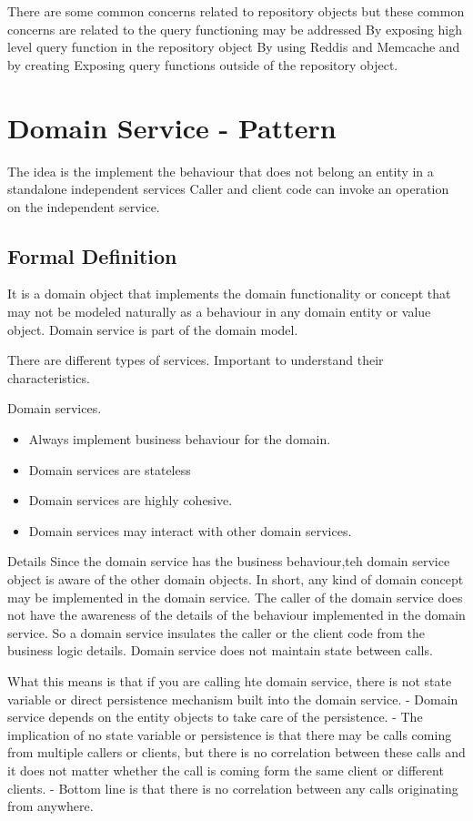 There are some common concerns related to repository objects but these common concerns are related to the query functioning may be addressed
By exposing high level query function in the repository object
By using Reddis and Memcache and by creating
Exposing query functions outside of the repository object.


\section{Domain Service - Pattern}
The idea is the implement the behaviour that does not belong an entity in a standalone independent services
Caller and client code can invoke an operation on the independent service.

\subsection{Formal Definition}
It is a domain object that implements the domain functionality or concept that may not be modeled naturally as a behaviour in any domain entity or value object.
Domain service is part of the domain model.

There are different types of services.
Important to understand their characteristics.

Domain services.
\begin{itemize}
    \item Always implement business behaviour for the domain.
    \item Domain services are stateless
    \item Domain services are highly cohesive.
    \item Domain services may interact with other domain services.
\end{itemize}

Details
Since the domain service has the business behaviour,teh domain service object is aware of the other domain objects.
In short, any kind of domain concept may be implemented in the domain service.
The caller of the domain service does not have the awareness of the details of the behaviour implemented in the domain service.
So a domain service insulates the caller or the client code from the business logic details.
Domain service does not maintain state between calls.

What this means is that if you are calling hte domain service, there is not state variable or direct persistence mechanism built into the domain service.
- Domain service depends on the entity objects to take care of the persistence.
- The implication of no state variable or persistence is that there may be calls coming from multiple callers or clients,
but there is no correlation between these calls and it does not matter whether the call is coming form the same client or different clients.
- Bottom line is that there is no correlation between any calls originating from anywhere.

